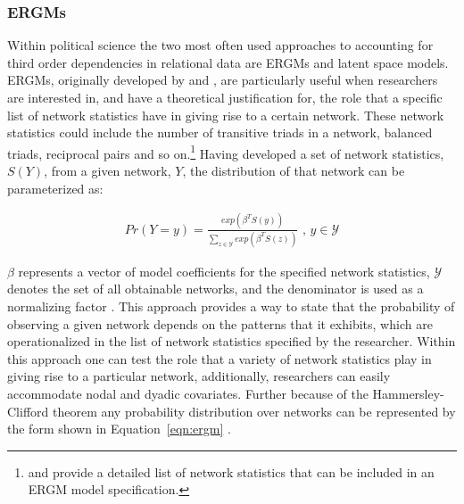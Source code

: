 \subsubsection{\textbf{ERGMs}}

Within political science the two most often used approaches to accounting for third order dependencies in relational data are ERGMs and latent space models. ERGMs, originally developed by \citet{frank:strauss:1986} and \citet{wasserman:pattison:1996}, are particularly useful when researchers are interested in, and have a theoretical justification for, the role that a specific list of network statistics have in giving rise to a certain network. These network statistics could include the number of transitive triads in a network, balanced triads, reciprocal pairs and so on.\footnote{\citet{morris:etal:2008} and \citet{snijders:etal:2006} provide a detailed list of network statistics that can be included in an ERGM model specification.} Having developed a set of network statistics, $S(Y)$, from a given network, $Y$, the distribution of that network can be parameterized as:

\begin{align}
Pr(Y = y) = \frac{ exp( \beta^{T} S(y)  )  }{ \sum_{z \in \mathcal{Y}} exp( \beta^{T} S(z)  )  } \text{ ,  } y \in \mathcal{Y}
\label{eqn:ergm}
\end{align}

$\beta$ represents a vector of model coefficients for the specified network statistics, $\mathcal{Y}$ denotes the set of all obtainable networks, and the denominator is used as a normalizing factor \citep{hunter:etal:2008}. This approach provides a way to state that the probability of observing a given network depends on the patterns that it exhibits, which are operationalized in the list of network statistics specified by the researcher. Within this approach one can test the role that a variety of network statistics play in giving rise to a particular network, additionally, researchers can easily accommodate nodal and dyadic covariates. Further because of the Hammersley-Clifford theorem any probability distribution over networks can be represented by the form shown in Equation~\ref{eqn:ergm} \cite{hammersley:clifford:1971}. 

